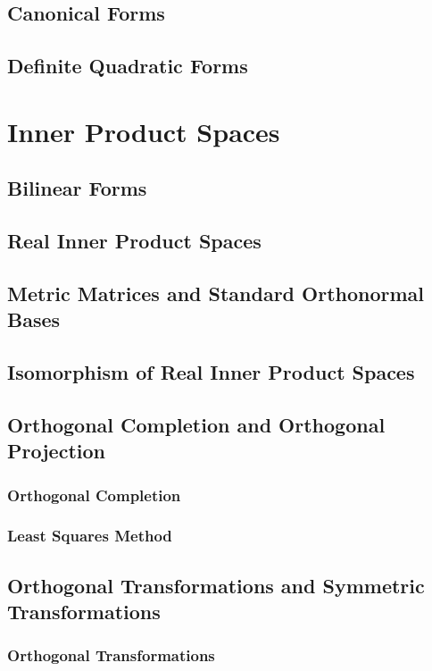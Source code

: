 \documentclass[11pt]{../../TexTemplate/elegantbook} %
\begin{document}
\section{Canonical Forms}
\section{Definite Quadratic Forms}


\chapter{Inner Product Spaces}
\section{Bilinear Forms}

\section{Real Inner Product Spaces}

\section{Metric Matrices and Standard Orthonormal Bases}

\section{Isomorphism of Real Inner Product Spaces}

\section{Orthogonal Completion and Orthogonal Projection}
\subsection{Orthogonal Completion}

\subsection{Least Squares Method}

\section{Orthogonal Transformations and Symmetric Transformations}
\subsection{Orthogonal Transformations}
\end{document}
